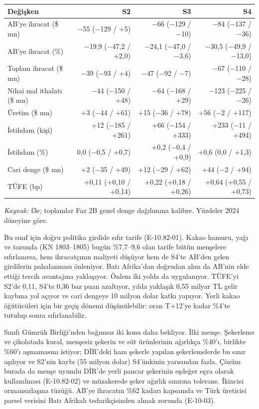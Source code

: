 \begin{longtable}[]{@{}lrrr@{}}
\toprule\noalign{}
\textbf{Değişken} & \textbf{S2} & \textbf{S3} & \textbf{S4} \\
\midrule\noalign{}
\endhead
\bottomrule\noalign{}
\endlastfoot
AB'ye ihracat (\$ mn) & −55 (−129 / +5) & −66 (−129 / −10) & −84 (−137 / −36) \\
AB'ye ihracat (\%) & −19,9 (−47,2 / +2,0) & −24,1 (−47,0 / −3,6) & −30,5 (−49,9 / −13,0) \\
Toplam ihracat (\$ mn) & −39 (−93 / +4) & −47 (−92 / −7) & −67 (−110 / −28) \\
Nihai mal ithalatı (\$ mn) & −44 (−150 / +48) & −64 (−168 / +29) & −123 (−225 / −26) \\
Üretim (\$ mn) & +3 (−44 / +61) & +15 (−36 / +78) & +56 (−2 / +117) \\
İstihdam (kişi) & +12 (−185 / +261) & +66 (−154 / +333) & +233 (−11 / +494) \\
İstihdam (\%) & 0,0 (−0,5 / +0,7) & +0,2 (−0,4 / +0,9) & +0,6 (0,0 / +1,3) \\
Cari denge (\$ mn) & +2 (−35 / +49) & +12 (−29 / +62) & +44 (−2 / +94) \\
TÜFE (bp) & +0,11 (+0,10 / +0,14) & +0,22 (+0,18 / +0,26) & +0,64 (+0,55 / +0,73) \\
\end{longtable}

\endgroup

\emph{Kaynak:} \etiketT{} f3e; toplamlar Faz 2B genel denge dağılımına kalibre. Yüzdeler 2024 düzeyine göre.

Bu sınıf için doğru politika girdide sıfır tarife (E-10.82-01). Kakao hamuru, yağı ve tozunda (KN 1803--1805) bugün \%7,7--9,6 olan tarife bütün menşelere sıfırlanırsa, hem ihracatçının maliyeti düşüyor hem de S4'te AB'den gelen girdilerin pahalanması önleniyor. Batı Afrika'dan doğrudan alım da AB'nin elde ettiği tercih avantajına yaklaşıyor. Önlem iki yolda da uygulanıyor. TÜFE'yi S2'de 0,11, S4'te 0,36 baz puan azaltıyor, yılda yaklaşık 0,55 milyar TL gelir kaybına yol açıyor ve cari dengeye 10 milyon dolar katkı yapıyor. Yerli kakao öğütücüleri için bir geçiş dönemi düşünülebilir: oran T+12'ye kadar \%4'te tutulup sonra sıfırlanabilir.

Sınıfı Gümrük Birliği'nden bağımsız iki konu daha bekliyor. İlki menşe. Şekerleme ve çikolatada kural, menşesiz şekerin ve süt ürünlerinin ağırlıkça \%40'ı, birlikte \%60'ı aşmamasını istiyor; DİR'deki ham şekerle yapılan şekerlemelerde bu sınır aşılıyor ve S2'nin kaybı (55 milyon dolar) S4'ünkinin yarısından fazla. Çözüm burada da menşe uyumlu DİR'de yerli pancar şekerinin eşdeğer eşya olarak kullanılması (E-10.82-02) ve müzakerede şeker ağırlık sınırına tolerans. İkincisi ormansızlaşma tüzüğü. AB'ye ihracatın \%62 kadarı kapsamda ve Türk üreticisi parsel verisini Batı Afrikalı tedarikçisinden almak zorunda (E-10-03).

